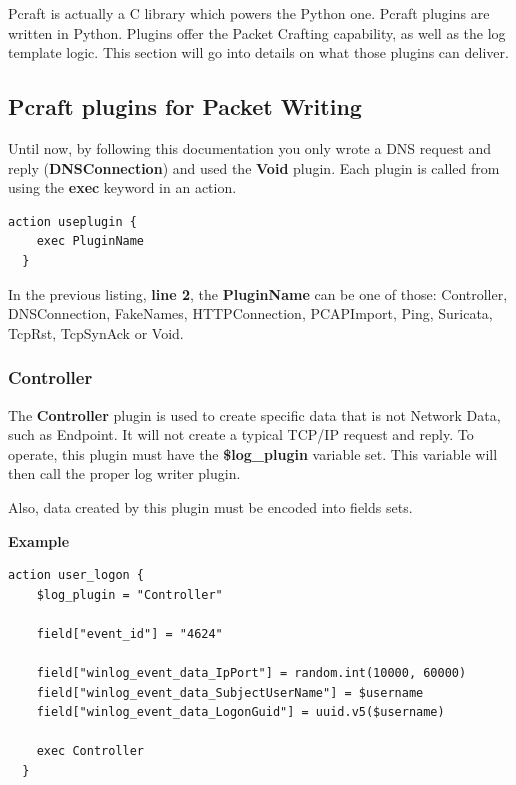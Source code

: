 \documentclass[10pt]{article}
\begin{document}
Pcraft is actually a C library which powers the Python one. Pcraft plugins are written in Python. Plugins offer the Packet Crafting capability, as well as the log template logic. This section will go into details on what those plugins can deliver.

\subsection{Pcraft plugins for Packet Writing}

Until now, by following this documentation you only wrote a DNS request and reply (\textbf{DNSConnection}) and used the \textbf{Void} plugin. Each plugin is called from using the \textbf{exec} keyword in an action.

\begin{lstlisting}[caption={Packet Writing plugins},captionpos=b]
  action useplugin {
    exec PluginName
  }
\end{lstlisting}

In the previous listing, \textbf{line 2}, the \textbf{PluginName} can be one of those: Controller, DNSConnection, FakeNames, HTTPConnection, PCAPImport, Ping, Suricata, TcpRst, TcpSynAck or Void.

\subsubsection{Controller}

The \textbf{Controller} plugin is used to create specific data that is not Network Data, such as Endpoint. It will not create a typical TCP/IP request and reply. To operate, this plugin must have the \textbf{\$log\_plugin} variable set. This variable will then call the proper log writer plugin.

Also, data created by this plugin must be encoded into fields sets.

\textbf{Example}

\begin{lstlisting}[caption={Controller plugin writing Windows User Login},captionpos=b]
  action user_logon {
    $log_plugin = "Controller"
    
    field["event_id"] = "4624"

    field["winlog_event_data_IpPort"] = random.int(10000, 60000)
    field["winlog_event_data_SubjectUserName"] = $username
    field["winlog_event_data_LogonGuid"] = uuid.v5($username)
    
    exec Controller
  }
\end{lstlisting}
\end{document}
